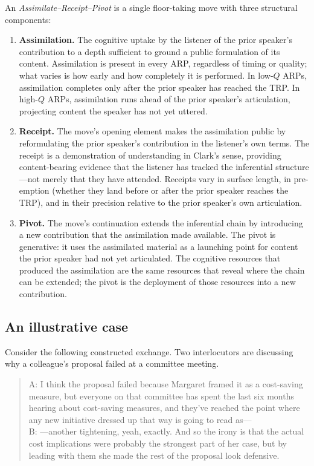 An \emph{Assimilate--Receipt--Pivot} is a single floor-taking move with three structural components:

\begin{enumerate}[leftmargin=2em,label=\arabic*.]
  \item \textbf{Assimilation.} The cognitive uptake by the listener of the prior speaker's contribution to a depth sufficient to ground a public formulation of its content. Assimilation is present in every ARP, regardless of timing or quality; what varies is how early and how completely it is performed. In low-$Q$ ARPs, assimilation completes only after the prior speaker has reached the TRP. In high-$Q$ ARPs, assimilation runs ahead of the prior speaker's articulation, projecting content the speaker has not yet uttered.
  \item \textbf{Receipt.} The move's opening element makes the assimilation public by reformulating the prior speaker's contribution in the listener's own terms. The receipt is a demonstration of understanding in Clark's sense, providing content-bearing evidence that the listener has tracked the inferential structure---not merely that they have attended. Receipts vary in surface length, in pre-emption (whether they land before or after the prior speaker reaches the TRP), and in their precision relative to the prior speaker's own articulation.
  \item \textbf{Pivot.} The move's continuation extends the inferential chain by introducing a new contribution that the assimilation made available. The pivot is generative: it uses the assimilated material as a launching point for content the prior speaker had not yet articulated. The cognitive resources that produced the assimilation are the same resources that reveal where the chain can be extended; the pivot is the deployment of those resources into a new contribution.
\end{enumerate}

\subsection{An illustrative case}

Consider the following constructed exchange. Two interlocutors are discussing why a colleague's proposal failed at a committee meeting.

\begin{quote}
A: I think the proposal failed because Margaret framed it as a cost-saving measure, but everyone on that committee has spent the last six months hearing about cost-saving measures, and they've reached the point where any new initiative dressed up that way is going to read as---\\
B: ---another tightening, yeah, exactly. And so the irony is that the actual cost implications were probably the strongest part of her case, but by leading with them she made the rest of the proposal look defensive.
\end{quote}

